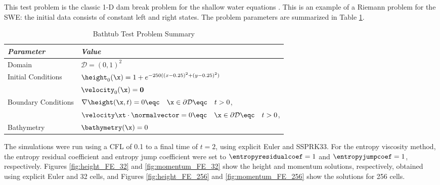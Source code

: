 This test problem is the classic 1-D dam break problem for the shallow
water equations \cite{leveque2002}. This is an example of a Riemann problem
for the SWE: the initial data consists of constant left and right states.
The problem parameters are summarized in Table \ref{tab:dam_break_1d}.

\begin{table}[htb]\caption{Bathtub Test Problem Summary}
\label{tab:dam_break_1d}
\centering
\begin{tabular}{l l}\toprule
\emph{Parameter} & \emph{Value}\\\midrule
Domain & $\mathcal{D} = (0,1)^2$\\
Initial Conditions & $\height_0(\x)=1 + e^{-250((x-0.25)^2+(y-0.25)^2)}$\\
                   & $\velocity_0(\x) = \mathbf{0}$\\
Boundary Conditions & $\nabla\height(\x,t)=0
  \eqc \quad \x\in\partial\mathcal{D}\eqc \quad t>0$,\\
                    & $\velocity\xt\cdot\normalvector = 0
  \eqc \quad \x\in\partial\mathcal{D}\eqc \quad t>0$,\\
Bathymetry & $\bathymetry(\x)=0$\\
\bottomrule\end{tabular}
\end{table}

The simulations were run using a CFL of 0.1 to a final time of $t=2$,
using explicit Euler and SSPRK33.
For the entropy viscosity method, the entropy residual coefficient
and entropy jump coefficient were set to $\entropyresidualcoef=1$
and $\entropyjumpcoef=1$, respectively.
Figures \ref{fig:height_FE_32} and \ref{fig:momentum_FE_32} 
show the height and momentum solutions, respectively, obtained using explicit Euler
and 32 cells, and Figures \ref{fig:height_FE_256} and \ref{fig:momentum_FE_256} 
show the solutions for 256 cells.

